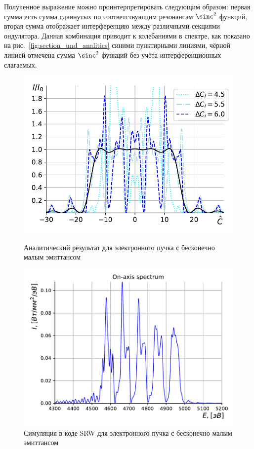 Полученное выражение можно проинтерпретировать следующим образом: первая сумма есть сумма сдвинутых по соответствующим резонансам $\sinc^2$ функций, вторая сумма отображает интерференцию между различными секциями ондулятора. Данная комбинация приводит к колебаниями в спектре, как показано на рис.~\ref{fig:section_und_analitics} синими пунктирными линиями, чёрной линией отмечена сумма $\sinc^2$ функций без учёта интерференционных слагаемых.
\begin{figure}[h!]
	\centering  
	\begin{minipage}{0.49\textwidth}
		\centering
		\includegraphics[width=\textwidth]{pic/spec_from_sec_und.pdf}
		\caption{Аналитический результат для электронного пучка с бесконечно малым эмиттансом}
		\label{fig:section_und_analitics}
	\end{minipage}\hfill
	\begin{minipage}{0.49\textwidth}
		\centering
		\includegraphics[width=\textwidth]{pic/sim_und_spec.pdf}
		\caption{Симуляция в коде SRW для электронного пучка с бесконечно малым эмиттансом}
		\label{fig:section_und_SRW}
	\end{minipage}    
\end{figure}
